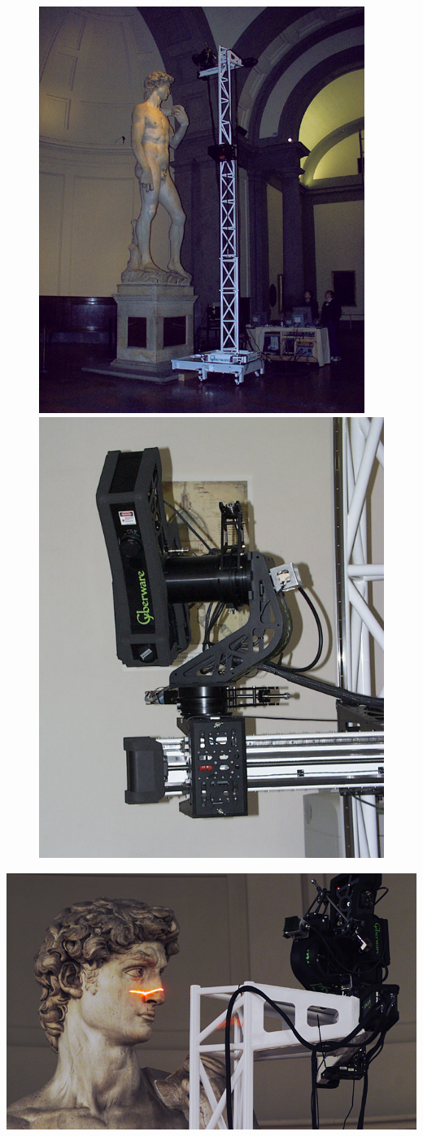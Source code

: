 \documentclass[table, usenames, svgnames, xcolor=dvipsnames]{beamer}
\begin{document}
\begin{frame} 
	\begin{figure}[!h]
		\centering
		\includegraphics[width=0.4\linewidth]{figs/gantry-and-david4-s.jpg}
		\includegraphics[width=0.4\linewidth]{figs/mgantry-scannerhead-s.jpg}
	\end{figure}
\end{frame}

\begin{frame} 
	\begin{center}
		\includegraphics[width=0.7\linewidth]{figs/scanner-head-and-david-head-s.jpg}
	\end{center}
\end{frame}
\end{document}
